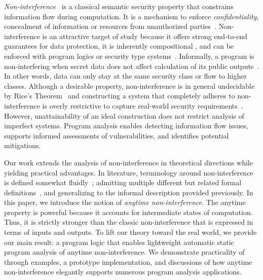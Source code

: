 \emph{Non-interference}~\cite{goguen1982} is a classical semantic security property that constrains information flow during computation.
It is a mechanism to enforce \emph{confidentiality}, \ie concealment of information or resources from unauthorized parties~\cite{bishop2003}.
Non-interference is an attractive target of study because it offers strong end-to-end guarantees for data protection, it is inherently compositional%
, and can be enforced with program logics or security type systems~\cite{cecchetti2017,frumin2021}.
Informally, a program is non-interfering when secret data does not affect calculation of its public outputs~\cite{sabelfeld2003}.
In other words, data can only stay at the same security class or flow to higher classes.
Although a desirable property, non-interference is in general undecidable by Rice's Theorem~\cite{rice1953} and constructing a system that completely adheres to non-interference is overly restrictive to capture real-world security requirements~\cite{bossi2005,cecchetti2017}.
However, unattainability of an ideal construction does not restrict analysis of imperfect systems.
Program analysis enables detecting information flow issues, supports informed assessments of vulnerabilities, and identifies potential mitigations.

Our work extends the analysis of non-interference %
in theoretical directions while yielding practical advantages.
In literature, terminology around non-interference is defined somewhat fluidly~\cite{sabelfeld2003};
admitting multiple different but related {formal definitions}~\cite{nelson2020}, and generalizing to the informal description provided previously.
In this paper, we introduce the notion of \emph{anytime non-interference}.
The anytime property is powerful because it accounts for intermediate states of computation.
Thus, it is strictly stronger than the classic non-interference that is expressed in terms of inputs and outputs.
To lift our theory toward the real world, we provide our main result:
a program logic \lname that enables lightweight automatic static program analysis of anytime non-interference.
We demonstrate practicality of \lname through examples, a prototype implementation,
and discussions of how anytime non-interference elegantly supports numerous program analysis applications.

